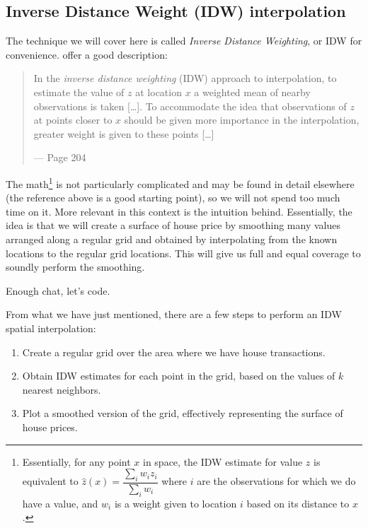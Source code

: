 \documentclass[]{book}
\providecommand{\tightlist}{%
  \setlength{\itemsep}{0pt}\setlength{\parskip}{0pt}}
\begin{document}
\subsection{Inverse Distance Weight (IDW)
interpolation}\label{inverse-distance-weight-idw-interpolation}

The technique we will cover here is called \emph{Inverse Distance
Weighting}, or IDW for convenience. \citet{comber2015} offer a good
description:

\begin{quote}
In the \emph{inverse distance weighting} (IDW) approach to
interpolation, to estimate the value of \(z\) at location \(x\) a
weighted mean of nearby observations is taken {[}\ldots{}{]}. To
accommodate the idea that observations of \(z\) at points closer to
\(x\) should be given more importance in the interpolation, greater
weight is given to these points {[}\ldots{}{]}

--- Page 204
\end{quote}

The math\footnote{Essentially, for any point \(x\) in space, the IDW
  estimate for value \(z\) is equivalent to
  \(\hat{z} (x) = \dfrac{\sum_i w_i z_i}{\sum_i w_i}\) where \(i\) are
  the observations for which we do have a value, and \(w_i\) is a weight
  given to location \(i\) based on its distance to \(x\).} is not
particularly complicated and may be found in detail elsewhere (the
reference above is a good starting point), so we will not spend too much
time on it. More relevant in this context is the intuition behind.
Essentially, the idea is that we will create a surface of house price by
smoothing many values arranged along a regular grid and obtained by
interpolating from the known locations to the regular grid locations.
This will give us full and equal coverage to soundly perform the
smoothing.

Enough chat, let's code.

From what we have just mentioned, there are a few steps to perform an
IDW spatial interpolation:

\begin{enumerate}
\def\labelenumi{\arabic{enumi}.}
\tightlist
\item
  Create a regular grid over the area where we have house transactions.
\item
  Obtain IDW estimates for each point in the grid, based on the values
  of \(k\) nearest neighbors.
\item
  Plot a smoothed version of the grid, effectively representing the
  surface of house prices.
\end{enumerate}
\end{document}
